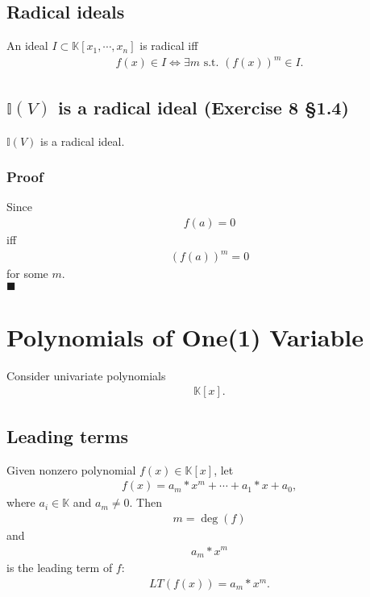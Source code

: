 \documentclass[11pt]{book}
\begin{document}
\subsection{Radical ideals}%
An ideal $I \subset \mathbb{K}[x_1,\cdots,x_n]$ is radical iff
\begin{eqnarray}
f(x) \in I \Leftrightarrow \exists m \text{ s.t. } \left( f(x) \right)^m \in I.
\end{eqnarray}

\subsection{$\mathbb{I}(V)$ is a radical ideal (Exercise 8 \S 1.4)}
$\mathbb{I}(V)$ is a radical ideal.

\subsubsection{Proof}
Since
\begin{eqnarray}
f(a) = 0
\end{eqnarray}
iff
\begin{eqnarray}
\left( f(a)  \right)^m  = 0
\end{eqnarray}
for some $m$.\\
$\blacksquare$


\section{Polynomials of One(1) Variable}
Consider univariate polynomials
\begin{eqnarray}
\mathbb{K}[x].
\end{eqnarray}

\subsection{Leading terms}
Given nonzero polynomial $f(x) \in \mathbb{K}[x]$, let
\begin{eqnarray}
f(x) = a_m * x^m + \cdots + a_1 * x + a_0,
\end{eqnarray}
where $a_i \in \mathbb{K}$ and $a_m \neq 0$.
Then
\begin{eqnarray}
m = \deg(f)
\end{eqnarray}
and
\begin{eqnarray}
a_m * x^m
\end{eqnarray}
is the leading term of $f$:
\begin{eqnarray}
LT\left(f(x) \right) = a_m * x^m.
\end{eqnarray}
\end{document}
